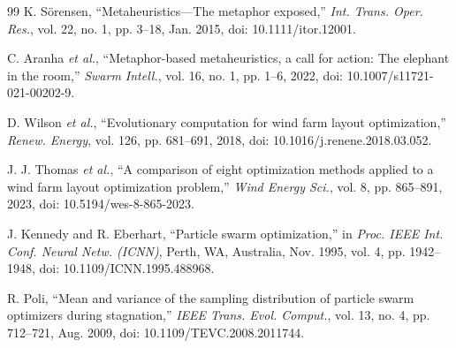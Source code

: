 {\begin{thebibliography}{99}
K. S\"orensen, ``Metaheuristics---The metaphor exposed,'' \textit{Int. Trans. Oper. Res.}, vol. 22, no. 1, pp. 3--18, Jan. 2015, doi: 10.1111/itor.12001.

C. Aranha \textit{et al.}, ``Metaphor-based metaheuristics, a call for action: The elephant in the room,'' \textit{Swarm Intell.}, vol. 16, no. 1, pp. 1--6, 2022, doi: 10.1007/s11721-021-00202-9.

D. Wilson \textit{et al.}, ``Evolutionary computation for wind farm layout optimization,'' \textit{Renew. Energy}, vol. 126, pp. 681--691, 2018, doi: 10.1016/j.renene.2018.03.052.

J. J. Thomas \textit{et al.}, ``A comparison of eight optimization methods applied to a wind farm layout optimization problem,'' \textit{Wind Energy Sci.}, vol. 8, pp. 865--891, 2023, doi: 10.5194/wes-8-865-2023.

J. Kennedy and R. Eberhart, ``Particle swarm optimization,'' in \textit{Proc. IEEE Int. Conf. Neural Netw. (ICNN)}, Perth, WA, Australia, Nov. 1995, vol. 4, pp. 1942--1948, doi: 10.1109/ICNN.1995.488968.

R. Poli, ``Mean and variance of the sampling distribution of particle swarm optimizers during stagnation,'' \textit{IEEE Trans. Evol. Comput.}, vol. 13, no. 4, pp. 712--721, Aug. 2009, doi: 10.1109/TEVC.2008.2011744.


\end{thebibliography}}
